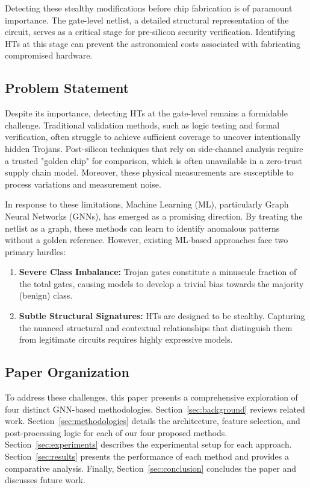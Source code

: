 \documentclass[conference]{IEEEtran}
\begin{document}
Detecting these stealthy modifications before chip fabrication is of paramount importance. The gate-level netlist, a detailed structural representation of the circuit, serves as a critical stage for pre-silicon security verification. Identifying HTs at this stage can prevent the astronomical costs associated with fabricating compromised hardware.

\subsection{Problem Statement}
Despite its importance, detecting HTs at the gate-level remains a formidable challenge. Traditional validation methods, such as logic testing and formal verification, often struggle to achieve sufficient coverage to uncover intentionally hidden Trojans. Post-silicon techniques that rely on side-channel analysis require a trusted "golden chip" for comparison, which is often unavailable in a zero-trust supply chain model. Moreover, these physical measurements are susceptible to process variations and measurement noise.

In response to these limitations, Machine Learning (ML), particularly Graph Neural Networks (GNNs), has emerged as a promising direction. By treating the netlist as a graph, these methods can learn to identify anomalous patterns without a golden reference. However, existing ML-based approaches face two primary hurdles:
\begin{enumerate}
    \item \textbf{Severe Class Imbalance:} Trojan gates constitute a minuscule fraction of the total gates, causing models to develop a trivial bias towards the majority (benign) class.
    \item \textbf{Subtle Structural Signatures:} HTs are designed to be stealthy. Capturing the nuanced structural and contextual relationships that distinguish them from legitimate circuits requires highly expressive models.
\end{enumerate}

\subsection{Paper Organization}
To address these challenges, this paper presents a comprehensive exploration of four distinct GNN-based methodologies. Section~\ref{sec:background} reviews related work. Section~\ref{sec:methodologies} details the architecture, feature selection, and post-processing logic for each of our four proposed methods. Section~\ref{sec:experiments} describes the experimental setup for each approach. Section~\ref{sec:results} presents the performance of each method and provides a comparative analysis. Finally, Section~\ref{sec:conclusion} concludes the paper and discusses future work.
\end{document}
